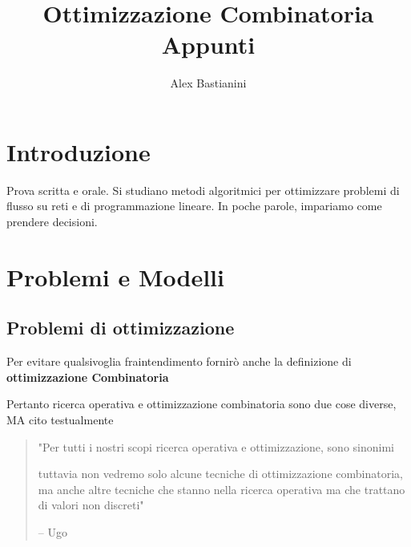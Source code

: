 \documentclass{report}
\title{\Huge{Ottimizzazione Combinatoria}\\Appunti}
\author{\huge{Alex Bastianini}}
\date{}
\begin{document}
\maketitle
\newpage%
\tableofcontents

\pagebreak

\chapter{Introduzione}
Prova scritta e orale. Si studiano metodi algoritmici per ottimizzare problemi di flusso su reti e di programmazione lineare. In poche parole, impariamo come prendere decisioni.

\chapter{Problemi e Modelli}

\section{Problemi di ottimizzazione}


Per evitare qualsivoglia fraintendimento fornirò anche la definizione di \textbf{ottimizzazione Combinatoria}

Pertanto ricerca operativa e ottimizzazione combinatoria sono due cose diverse, MA cito testualmente
\begin{quote}
  "Per tutti i nostri scopi ricerca operativa e ottimizzazione, sono sinonimi

  tuttavia non vedremo solo alcune tecniche di ottimizzazione combinatoria, ma anche altre tecniche che stanno nella ricerca operativa ma che trattano di valori non discreti"

  \hfill -- Ugo
\end{quote}
\end{document}
